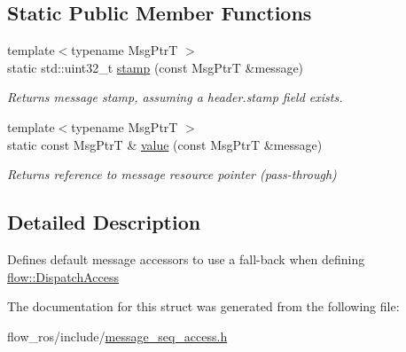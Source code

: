 \subsection*{Static Public Member Functions}
\begin{DoxyCompactItemize}
\item 
\mbox{\label{structflow__ros_1_1_default_message_seq_dispatch_access_afb8807ce253d3a876b4b2d8ba9046757}} 
{\footnotesize template$<$typename Msg\+PtrT $>$ }\\static std\+::uint32\+\_\+t \hyperlink{structflow__ros_1_1_default_message_seq_dispatch_access_afb8807ce253d3a876b4b2d8ba9046757}{stamp} (const Msg\+PtrT \&message)
\begin{DoxyCompactList}\small\item\em Returns message stamp, assuming a {\ttfamily header.\+stamp} field exists. \end{DoxyCompactList}\item 
\mbox{\label{structflow__ros_1_1_default_message_seq_dispatch_access_ad8c7f30400b1f554aed69e50f8533d6d}} 
{\footnotesize template$<$typename Msg\+PtrT $>$ }\\static const Msg\+PtrT \& \hyperlink{structflow__ros_1_1_default_message_seq_dispatch_access_ad8c7f30400b1f554aed69e50f8533d6d}{value} (const Msg\+PtrT \&message)
\begin{DoxyCompactList}\small\item\em Returns reference to message resource pointer (pass-\/through) \end{DoxyCompactList}\end{DoxyCompactItemize}


\subsection{Detailed Description}
Defines default message accessors to use a fall-\/back when defining {\ttfamily \hyperlink{structflow_1_1_dispatch_access}{flow\+::\+Dispatch\+Access}} 

The documentation for this struct was generated from the following file\+:\begin{DoxyCompactItemize}
\item 
flow\+\_\+ros/include/\hyperlink{message__seq__access_8h}{message\+\_\+seq\+\_\+access.\+h}\end{DoxyCompactItemize}
